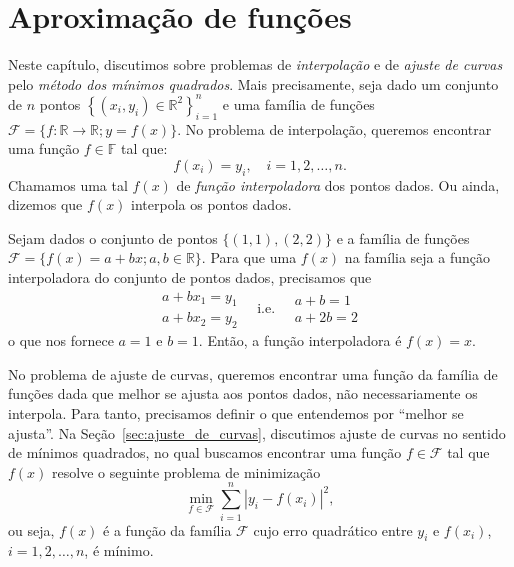 
%

\chapter{Aproximação de funções}

Neste capítulo, discutimos sobre problemas de \emph{interpolação} e de \emph{ajuste de curvas} pelo \emph{método dos mínimos quadrados}. Mais precisamente, seja dado um conjunto de $n$ pontos $\left\{(x_i, y_i)\in \mathbb{R}^2\right\}_{i=1}^n$ e uma família de funções $\mathcal{F} = \{f:\mathbb{R}\to\mathbb{R}; y = f(x)\}$. No problema de interpolação, queremos encontrar uma função $f\in\mathbb{F}$ tal que:
\begin{equation*}
  f(x_i) = y_i,\quad i=1, 2, \dotsc, n.
\end{equation*}
Chamamos uma tal $f(x)$ de \emph{função interpoladora} dos pontos dados. Ou ainda, dizemos que $f(x)$ interpola os pontos dados.

\begin{ex}
  Sejam dados o conjunto de pontos $\{(1, 1), (2, 2)\}$ e a família de funções $\mathcal{F} = \{f(x) = a + bx; a,b\in\mathbb{R}\}$. Para que uma $f(x)$ na família seja a função interpoladora do conjunto de pontos dados, precisamos que
  \begin{equation*}
    \begin{array}{l}
      a + bx_1 = y_1\\
      a + bx_2 = y_2
    \end{array}\quad\text{i.e.}\quad
    \begin{array}{l}
      a + b = 1\\
      a + 2b = 2
    \end{array}
  \end{equation*}
o que nos fornece $a = 1$ e $b = 1$. Então, a função interpoladora é $f(x) = x$.
\end{ex}

No problema de ajuste de curvas, queremos encontrar uma função da família de funções dada que melhor se ajusta aos pontos dados, não necessariamente os interpola. Para tanto, precisamos definir o que entendemos por ``melhor se ajusta''. Na Seção~\ref{sec:ajuste_de_curvas}, discutimos ajuste de curvas no sentido de mínimos quadrados, no qual buscamos encontrar uma função $f\in\mathcal{F}$ tal que $f(x)$ resolve o seguinte problema de minimização
\begin{equation*}
  \min_{f\in\mathcal{F}} \sum_{i=1}^n |y_i - f(x_i)|^2,
\end{equation*}
ou seja, $f(x)$ é a função da família $\mathcal{F}$ cujo erro quadrático entre $y_i$ e $f(x_i)$, $i = 1, 2, \dotsc, n$, é mínimo.

